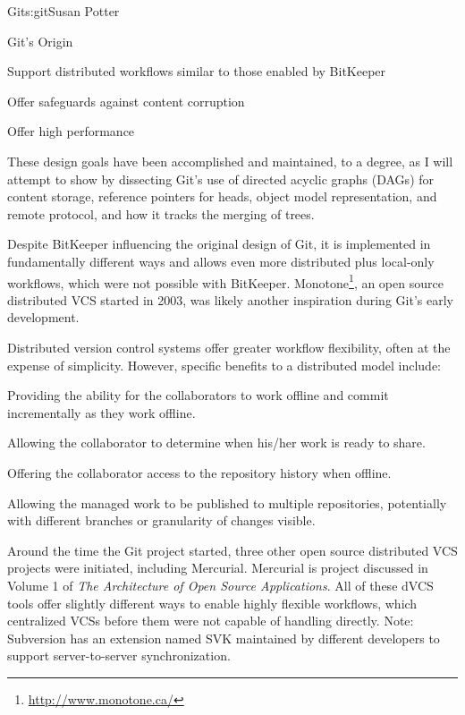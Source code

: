 \begin{aosachapter}{Git}{s:git}{Susan Potter}
\begin{aosasect1}{Git's Origin}
\begin{aosaitemize}
  \item Support distributed workflows similar to those enabled by BitKeeper
  \item Offer safeguards against content corruption
  \item Offer high performance
\end{aosaitemize}

These design goals have been accomplished and maintained, to a degree, as I
will attempt to show by dissecting Git's use of directed acyclic graphs
(DAGs) for content storage, reference pointers for heads, object model
representation, and remote protocol, and how it tracks the merging of trees.

Despite BitKeeper influencing the original design of Git, it is implemented
in fundamentally different ways and allows even more distributed plus
local-only workflows, which were not possible with BitKeeper. 
Monotone\footnote{\url{http://www.monotone.ca/}},
an open source distributed VCS started in 2003, was likely another
inspiration during Git's early development.

Distributed version control systems offer greater workflow flexibility, often
at the expense of simplicity. However, specific benefits to a distributed
model include:
\begin{aosaitemize}
  \item Providing the ability for the collaborators to work offline and
  commit incrementally as they work offline.
  \item Allowing the collaborator to determine when his/her work is
  ready to share.
  \item Offering the collaborator access to the repository history when
  offline.
  \item Allowing the managed work to be published to multiple repositories,
  potentially with different branches or granularity of changes visible.
\end{aosaitemize}

Around the time the Git project started, three other open source
distributed VCS projects were initiated, including Mercurial. Mercurial is 
project discussed in Volume 1 of \emph{The Architecture of Open Source Applications}. All of these dVCS tools
offer slightly different ways to enable highly flexible workflows, which
centralized VCSs before them were not capable of handling directly.
Note: Subversion has an extension named SVK maintained by different developers
to support server-to-server synchronization.


\end{aosasect1}
\end{aosachapter}
